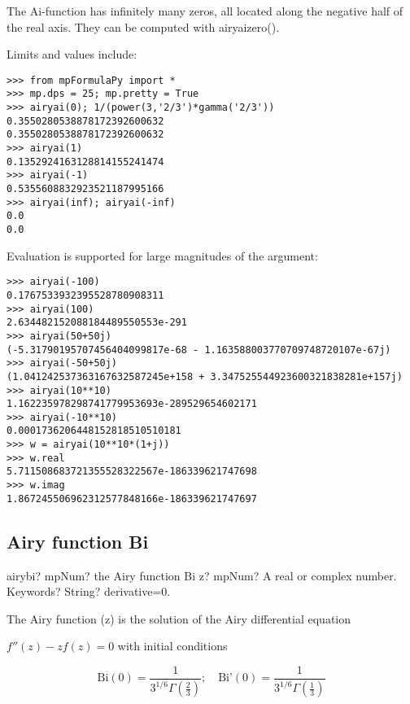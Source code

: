 The Ai-function has infinitely many zeros, all located along the negative half of the real
axis. They can be computed with airyaizero().

Limits and values include:

\begin{lstlisting}
>>> from mpFormulaPy import *
>>> mp.dps = 25; mp.pretty = True
>>> airyai(0); 1/(power(3,'2/3')*gamma('2/3'))
0.3550280538878172392600632
0.3550280538878172392600632
>>> airyai(1)
0.1352924163128814155241474
>>> airyai(-1)
0.5355608832923521187995166
>>> airyai(inf); airyai(-inf)
0.0
0.0
\end{lstlisting}

Evaluation is supported for large magnitudes of the argument:

\begin{lstlisting}
>>> airyai(-100)
0.1767533932395528780908311
>>> airyai(100)
2.634482152088184489550553e-291
>>> airyai(50+50j)
(-5.31790195707456404099817e-68 - 1.163588003770709748720107e-67j)
>>> airyai(-50+50j)
(1.041242537363167632587245e+158 + 3.347525544923600321838281e+157j)
>>> airyai(10**10)
1.162235978298741779953693e-289529654602171
>>> airyai(-10**10)
0.0001736206448152818510510181
>>> w = airyai(10**10*(1+j))
>>> w.real
5.711508683721355528322567e-186339621747698
>>> w.imag
1.867245506962312577848166e-186339621747697
\end{lstlisting}



\subsection{Airy function Bi}

\begin{mpFunctionsExtract}
	\mpFunctionTwo
	{airybi? mpNum? the Airy function Bi}
	{z? mpNum? A real or complex number.}
	{Keywords? String? derivative=0.}	
\end{mpFunctionsExtract}

\vpara
The Airy function (z) is the solution of the Airy differential equation 

$f''(z)-z f(z)=0$ with initial conditions

\begin{equation}
\text{Bi}(0)=\frac{1}{3^{1/6}\Gamma\left(\frac{2}{3}\right)}; \quad \text{Bi'}(0)=\frac{1}{3^{1/6}\Gamma\left(\frac{1}{3}\right)}
\end{equation}


